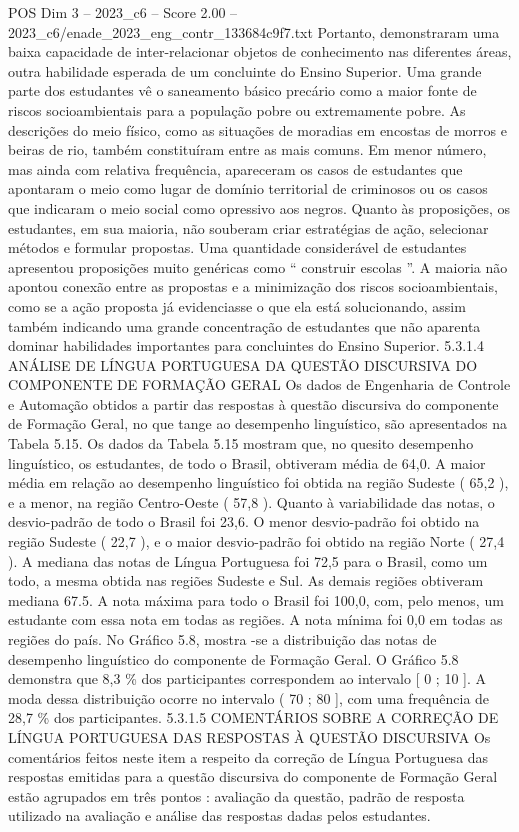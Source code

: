\begin{textsample}{POS Dim 3 – 2023\_c6 – Score 2.00 – 2023\_c6/enade\_2023\_eng\_contr\_133684c9f7.txt}
Portanto, demonstraram uma baixa capacidade de inter-relacionar objetos de conhecimento nas diferentes áreas, outra habilidade esperada de um concluinte do Ensino Superior.
Uma grande parte dos estudantes vê o saneamento básico precário como a maior fonte de riscos socioambientais para a população pobre ou extremamente pobre.
As descrições do meio físico, como as situações de moradias em encostas de morros e beiras de rio, também constituíram entre as mais comuns.
Em menor número, mas ainda com relativa frequência, apareceram os casos de estudantes que apontaram o meio como lugar de domínio territorial de criminosos ou os casos que indicaram o meio social como opressivo aos negros.
Quanto às proposições, os estudantes, em sua maioria, não souberam criar estratégias de ação, selecionar métodos e formular propostas.
Uma quantidade considerável de estudantes apresentou proposições muito genéricas como “ construir escolas ”.
A maioria não apontou conexão entre as propostas e a minimização dos riscos socioambientais, como se a ação proposta já evidenciasse o que ela está solucionando, assim também indicando uma grande concentração de estudantes que não aparenta dominar habilidades importantes para concluintes do Ensino Superior. 5.3.1.4 ANÁLISE DE LÍNGUA PORTUGUESA DA QUESTÃO DISCURSIVA DO COMPONENTE DE FORMAÇÃO GERAL Os dados de Engenharia de Controle e Automação obtidos a partir das respostas à questão discursiva do componente de Formação Geral, no que tange ao desempenho linguístico, são apresentados na Tabela 5.15.
Os dados da Tabela 5.15 mostram que, no quesito desempenho linguístico, os estudantes, de todo o Brasil, obtiveram média de 64,0.
A maior média em relação ao desempenho linguístico foi obtida na região Sudeste ( 65,2 ), e a menor, na região Centro-Oeste ( 57,8 ).
Quanto à variabilidade das notas, o desvio-padrão de todo o Brasil foi 23,6.
O menor desvio-padrão foi obtido na região Sudeste ( 22,7 ), e o maior desvio-padrão foi obtido na região Norte ( 27,4 ).
A mediana das notas de Língua Portuguesa foi 72,5 para o Brasil, como um todo, a mesma obtida nas regiões Sudeste e Sul.
As demais regiões obtiveram mediana 67.5.
A nota máxima para todo o Brasil foi 100,0, com, pelo menos, um estudante com essa nota em todas as regiões.
A nota mínima foi 0,0 em todas as regiões do país.
No Gráfico 5.8, mostra -se a distribuição das notas de desempenho linguístico do componente de Formação Geral.
O Gráfico 5.8 demonstra que 8,3 \% dos participantes correspondem ao intervalo [ 0 ; 10 ].
A moda dessa distribuição ocorre no intervalo ( 70 ; 80 ], com uma frequência de 28,7 \% dos participantes. 5.3.1.5 COMENTÁRIOS SOBRE A CORREÇÃO DE LÍNGUA PORTUGUESA DAS RESPOSTAS À QUESTÃO DISCURSIVA Os comentários feitos neste item a respeito da correção de Língua Portuguesa das respostas emitidas para a questão discursiva do componente de Formação Geral estão agrupados em três pontos : avaliação da questão, padrão de resposta utilizado na avaliação e análise das respostas dadas pelos estudantes.

\end{textsample}
